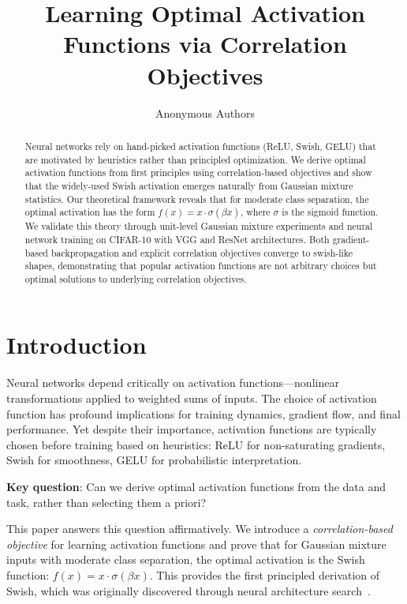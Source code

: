 \documentclass{article}
\title{Learning Optimal Activation Functions via Correlation Objectives}
\author{Anonymous Authors}
\begin{document}
\maketitle

\begin{abstract}
Neural networks rely on hand-picked activation functions (ReLU, Swish, GELU) that are motivated by heuristics rather than principled optimization. We derive optimal activation functions from first principles using correlation-based objectives and show that the widely-used Swish activation emerges naturally from Gaussian mixture statistics. Our theoretical framework reveals that for moderate class separation, the optimal activation has the form $f(x) = x \cdot \sigma(\beta x)$, where $\sigma$ is the sigmoid function. We validate this theory through unit-level Gaussian mixture experiments and neural network training on CIFAR-10 with VGG and ResNet architectures. Both gradient-based backpropagation and explicit correlation objectives converge to swish-like shapes, demonstrating that popular activation functions are not arbitrary choices but optimal solutions to underlying correlation objectives.
\end{abstract}

\section{Introduction}

Neural networks depend critically on activation functions---nonlinear transformations applied to weighted sums of inputs. The choice of activation function has profound implications for training dynamics, gradient flow, and final performance. Yet despite their importance, activation functions are typically chosen before training based on heuristics: ReLU for non-saturating gradients, Swish for smoothness, GELU for probabilistic interpretation.

\textbf{Key question}: Can we derive optimal activation functions from the data and task, rather than selecting them a priori?

This paper answers this question affirmatively. We introduce a \emph{correlation-based objective} for learning activation functions and prove that for Gaussian mixture inputs with moderate class separation, the optimal activation is the Swish function: $f(x) = x \cdot \sigma(\beta x)$. This provides the first principled derivation of Swish, which was originally discovered through neural architecture search~\citep{ramachandran2017searching}.
\end{document}
